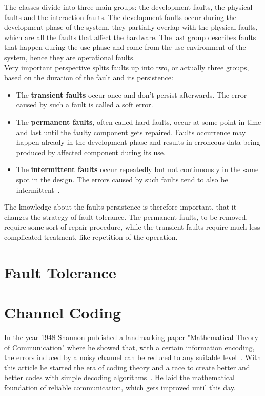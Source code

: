 \documentclass[]{myclass}
\begin{document}
The classes divide into three main groups: the development faults, the physical faults and the interaction faults. The development faults occur during the development phase of the system, they partially overlap with the physical faults, which are all the faults that affect the hardware. The last group describes faults that happen during the use phase and come from the use environment of the system, hence they are operational faults.\\
Very important perspective splits faults up into two, or actually three groups, based on the duration of the fault and its persistence:
\begin{itemize}
    \item The \textbf{transient faults} occur once and don't persist afterwards. The error caused by such a fault is called a soft error.
    \item The \textbf{permanent faults}, often called hard faults, occur at some point in time and last until the faulty component gets repaired. Faults occurrence may happen already in the development phase and results in erroneous data being produced by affected component during its use. 
    \item The \textbf{intermittent faults} occur repeatedly but not continuously in the same spot in the design. The errors caused by such faults tend to also be intermittent~\cite{book:Sorin}.
\end{itemize}
The knowledge about the faults persistence is therefore important, that it changes the strategy of fault tolerance. The permanent faults, to be removed, require some sort of repair procedure, while the transient faults require much less complicated treatment, like repetition of the operation.


\section{Fault Tolerance}


\section{Channel Coding} \label{sec:cod}
In the year 1948 Shannon published a landmarking paper "Mathematical Theory of Communication" where he showed that, with a certain information encoding, the errors induced by a noisy channel can be reduced to any suitable level~\cite{art:Shannon}. With this article he started the era of coding theory and a race to create better and better codes with simple decoding algorithms~\cite{book:Lint}. He laid the mathematical foundation of reliable communication, which gets improved until this day.\\
\end{document}
